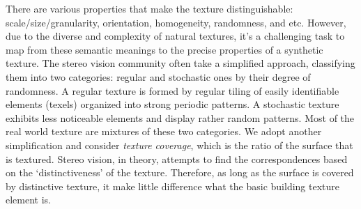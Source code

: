 There are various properties that make the texture distinguishable: scale/size/granularity, orientation, homogeneity, randomness, and etc. However, due to the diverse and complexity of natural textures, it's a challenging task to map from these semantic meanings to the precise properties of a synthetic texture. The stereo vision community often take a simplified approach, classifying them into two categories: regular and stochastic ones by their degree of randomness. A regular texture is formed by regular tiling of easily identifiable elements (texels) organized into strong periodic patterns. A stochastic texture exhibits less noticeable elements and display rather random patterns. Most of the real world texture are mixtures of these two categories. We adopt another simplification and consider \textit{texture coverage}, which is the ratio of the surface that is textured. Stereo vision, in theory, attempts to find the correspondences based on the `distinctiveness' of the texture. Therefore, as long as the surface is covered by distinctive texture, it make little difference what the basic building texture element is.




